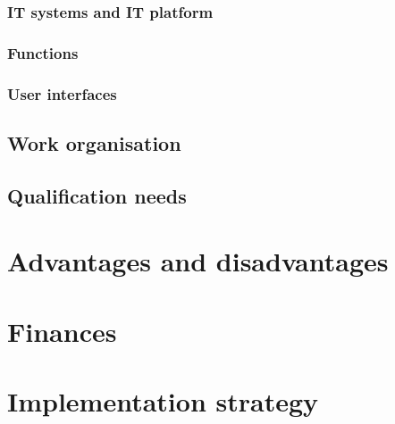 \subsubsection{IT systems and IT platform}

\subsubsection{Functions}

\subsubsection{User interfaces}

\subsection{Work organisation}
\label{sub:work_organisation}

\subsection{Qualification needs}
\label{sub:qualification_needs}

\section{Advantages and disadvantages}


\section{Finances}

\section{Implementation strategy}


